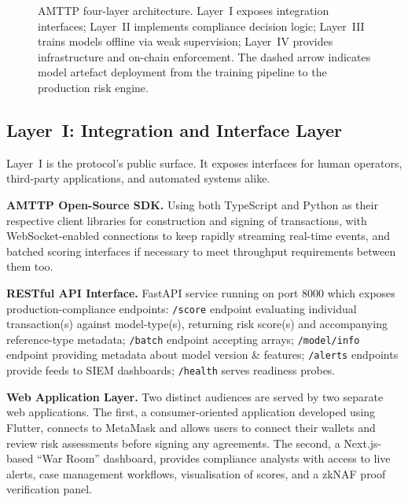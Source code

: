 \documentclass[journal]{IEEEtran}
\begin{document}
\begin{figure}[!t]
{%
}%
\caption{AMTTP four-layer architecture. Layer~I exposes integration interfaces; Layer~II implements compliance decision logic; Layer~III trains models offline via weak supervision; Layer~IV provides infrastructure and on-chain enforcement. The dashed arrow indicates model artefact deployment from the training pipeline to the production risk engine.}
\label{fig:architecture}
\end{figure}

\subsection{Layer~I: Integration and Interface Layer}

Layer~I is the protocol's public surface. It exposes interfaces for human operators, third-party applications, and automated systems alike.

\textbf{AMTTP Open-Source SDK.} Using both TypeScript and Python as their respective client libraries for construction and signing of transactions, with WebSocket-enabled connections to keep rapidly streaming real-time events, and batched scoring interfaces if necessary to meet throughput requirements between them too.

\textbf{RESTful API Interface.} FastAPI service running on port 8000 which exposes production-compliance endpoints: \texttt{/score} endpoint evaluating individual transaction(s) against model-type(s), returning risk score(s) and accompanying reference-type metadata; \texttt{/batch} endpoint accepting arrays; \texttt{/model/info} endpoint providing metadata about model version \& features; \texttt{/alerts} endpoints provide feeds to SIEM dashboards; \texttt{/health} serves readiness probes.

\textbf{Web Application Layer.} Two distinct audiences are served by two separate web applications. The first, a consumer-oriented application developed using Flutter, connects to MetaMask and allows users to connect their wallets and review risk assessments before signing any agreements. The second, a Next.js-based ``War Room'' dashboard, provides compliance analysts with access to live alerts, case management workflows, visualisation of scores, and a zkNAF proof verification panel.
\end{document}
